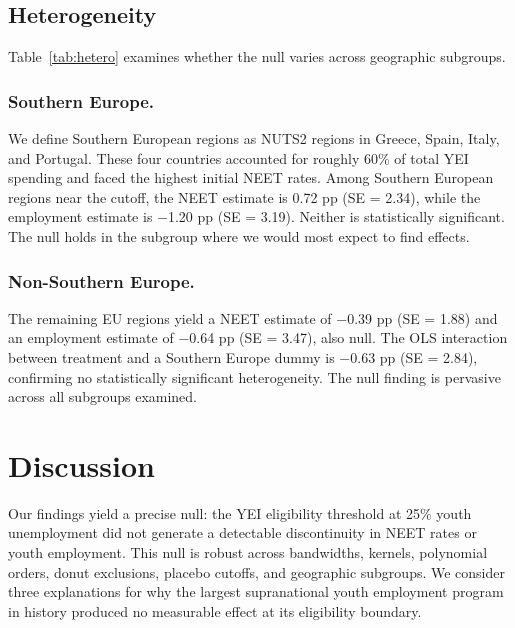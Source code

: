 \documentclass[12pt]{article}
\begin{document}
\subsection{Heterogeneity}

Table~\ref{tab:hetero} examines whether the null varies across geographic subgroups.



\subsubsection*{Southern Europe.} We define Southern European regions as NUTS2 regions in Greece, Spain, Italy, and Portugal. These four countries accounted for roughly 60\% of total YEI spending and faced the highest initial NEET rates. Among Southern European regions near the cutoff, the NEET estimate is 0.72 pp (SE = 2.34), while the employment estimate is $-$1.20 pp (SE = 3.19). Neither is statistically significant. The null holds in the subgroup where we would most expect to find effects.

\subsubsection*{Non-Southern Europe.} The remaining EU regions yield a NEET estimate of $-$0.39 pp (SE = 1.88) and an employment estimate of $-$0.64 pp (SE = 3.47), also null. The OLS interaction between treatment and a Southern Europe dummy is $-$0.63 pp (SE = 2.84), confirming no statistically significant heterogeneity. The null finding is pervasive across all subgroups examined.

\section{Discussion}

Our findings yield a precise null: the YEI eligibility threshold at 25\% youth unemployment did not generate a detectable discontinuity in NEET rates or youth employment. This null is robust across bandwidths, kernels, polynomial orders, donut exclusions, placebo cutoffs, and geographic subgroups. We consider three explanations for why the largest supranational youth employment program in history produced no measurable effect at its eligibility boundary.
\end{document}

